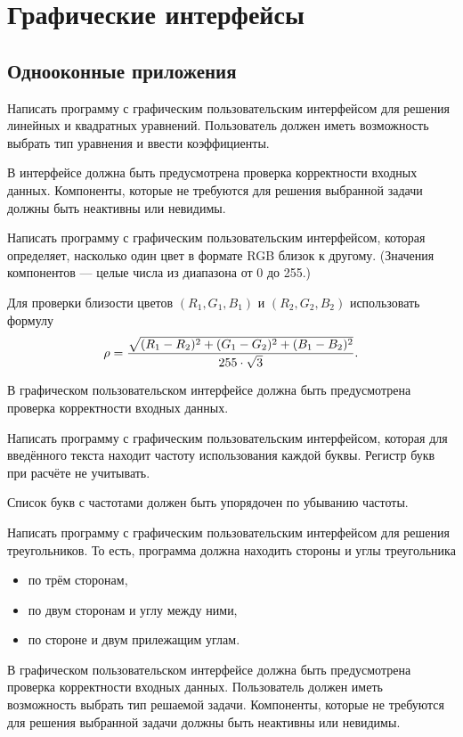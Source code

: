 \section{Графические интерфейсы}

\subsection{Однооконные приложения}

\task Написать программу с графическим пользовательским интерфейсом
для решения линейных и квадратных уравнений. Пользователь должен иметь
возможность выбрать тип уравнения и ввести коэффициенты.

В интерфейсе должна быть предусмотрена проверка корректности входных
данных. Компоненты, которые не требуются для решения выбранной задачи
должны быть неактивны или невидимы.

\task Написать программу с графическим пользовательским интерфейсом,
которая определяет, насколько один цвет в формате RGB близок к
другому. (Значения компонентов — целые числа из диапазона от 0 до 255.)

Для проверки близости цветов $(R_1, G_1, B_1)$ и $(R_2, G_2, B_2)$
использовать формулу
\[
\rho = {\sqrt{(R_1-R_2)^2 + (G_1-G_2)^2 + (B_1-B_2)^2} \over 255 \cdot \sqrt{3}}.
\]

В графическом пользовательском интерфейсе должна быть предусмотрена
проверка корректности входных данных.

\task Написать программу с графическим пользовательским интерфейсом,
которая для введённого текста находит частоту использования каждой
буквы. Регистр букв при расчёте не учитывать.

Список букв с частотами должен быть упорядочен по убыванию частоты.

\task Написать программу с графическим пользовательским интерфейсом
для решения треугольников. То есть, программа должна находить стороны
и углы треугольника
\begin{itemize}
\item по трём сторонам,
\item по двум сторонам и углу между ними,
\item по стороне и двум прилежащим углам.
\end{itemize}

В графическом пользовательском интерфейсе должна быть предусмотрена
проверка корректности входных данных. Пользователь должен иметь
возможность выбрать тип решаемой задачи. Компоненты, которые не
требуются для решения выбранной задачи должны быть неактивны или
невидимы.

